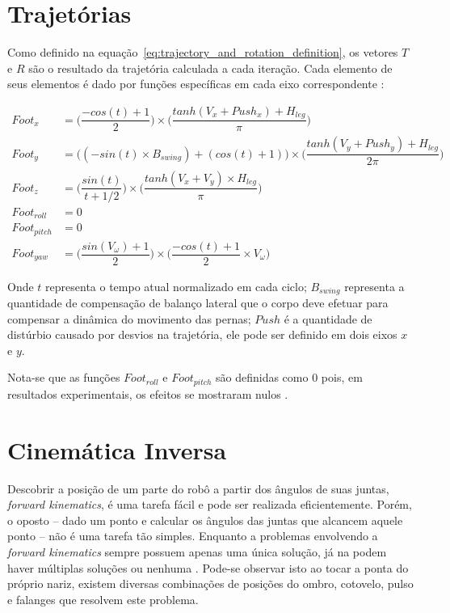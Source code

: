 \section{Trajetórias}
\label{sec:trajectories}

Como definido na equação~\ref{eq:trajectory_and_rotation_definition}, os vetores $T$ e $R$ são o resultado da trajetória calculada a cada iteração. Cada elemento de seus elementos é dado por funções específicas em cada eixo correspondente \cite{karimionline}:

\begin{align}
      Foot_x &= \bigg(\dfrac{-cos(t) + 1}{2}\bigg) \times \bigg(\dfrac{tanh(V_x + Push_x) + H_{leg}}{\pi}\bigg) \\
      Foot_y &= \big((-sin(t) \times B_{swing}) + (cos(t) + 1)\big) \times \bigg(\dfrac{tanh(V_y + Push_y) + H_{leg}}{2\pi}\bigg) \\
      Foot_z &= \bigg(\dfrac{sin(t)}{t + 1/2}\bigg) \times \bigg(\dfrac{tanh(V_x + V_y) \times H_{leg}}{\pi}\bigg) \\
 Foot_{roll} &= 0 \\
Foot_{pitch} &= 0 \\
  Foot_{yaw} &= \bigg(\dfrac{sin(V_\omega) + 1}{2}\bigg) \times \bigg(\dfrac{-cos(t) + 1}{2} \times V_\omega\bigg)
\end{align}

Onde $t$ representa o tempo atual normalizado em cada ciclo; $B_{swing}$ representa a quantidade de compensação de balanço lateral que o corpo deve efetuar para compensar a dinâmica do movimento das pernas; $Push$ é a quantidade de distúrbio causado por desvios na trajetória, ele pode ser definido em dois eixos $x$ e $y$.

Nota-se que as funções $Foot_{roll}$ e $Foot_{pitch}$ são definidas como $0$ pois, em resultados experimentais, os efeitos se mostraram nulos \cite{karimionline}.

\section{Cinemática Inversa}

Descobrir a posição de um parte do robô a partir dos ângulos de suas juntas, \textit{forward kinematics}, é uma tarefa fácil e pode ser realizada eficientemente. Porém, o oposto -- dado um ponto e calcular os ângulos das juntas que alcancem aquele ponto -- não é uma tarefa tão simples. Enquanto a problemas envolvendo a \textit{forward kinematics} sempre possuem apenas uma única solução, já na  podem haver múltiplas soluções ou nenhuma \cite{spong2005robot}. Pode-se observar isto ao tocar a ponta do próprio nariz, existem diversas combinações de posições do ombro, cotovelo, pulso e falanges que resolvem este problema.

